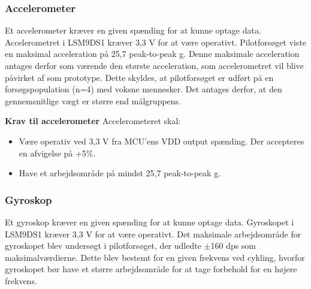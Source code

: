 \subsubsection{Accelerometer}
Et accelerometer kræver en given spænding for at kunne optage data. Accelerometret i  LSM9DS1 kræver 3,3 V for at være operativt. %
Pilotforsøget viste en maksimal acceleration på 25,7 peak-to-peak g. Denne maksimale acceleration antages derfor som værende den største acceleration, som accelerometret vil blive påvirket af som prototype. Dette skyldes, at pilotforsøget er udført på en forsøgspopulation (n=4) med voksne mennesker. Det antages derfor, at den gennemsnitlige vægt er større end målgruppens. %


\textbf{Krav til accelerometer} \newline 
Accelerometeret skal:
\begin{itemize}
\item Være operativ ved 3,3 V fra MCU'ens VDD output spænding. Der accepteres en afvigelse på +5\%.
\item Have et arbejdsområde på mindst 25,7 peak-to-peak g.
\end{itemize}

\subsubsection{Gyroskop} 
Et gyroskop kræver en given spænding for at kunne optage data. Gyroskopet i  LSM9DS1 kræver 3,3 V for at være operativt. %
Det maksimale arbejdsområde for gyroskopet blev undersøgt i pilotforsøget, der udledte $\pm$160 dps som maksimalværdierne. Dette blev bestemt for en given frekvens ved cykling, hvorfor gyroskopet bør have et større arbejdsområde for at tage forbehold for en højere frekvens. %

